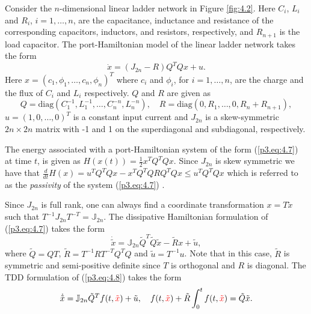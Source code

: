 Consider the $n$-dimensional linear ladder network in Figure \ref{fig:4.2}. Here $C_i$, $L_i$ and $R_i$, $i=1,\dots,n$, are the capacitance, inductance and resistance of the corresponding capacitors, inductors, and resistors, respectively, and $R_{n+1}$ is the load capacitor. The port-Hamiltonian model of the linear ladder network takes the form
\begin{equation} \label{p3.eq:4.7}
		\dot x = (J_{2n} - R)Q^TQx + u.
\end{equation}
Here $x = (c_1,\phi_1,\dots,c_n,\phi_n)^T$ where $c_i$ and $\phi_i$, for $i=1,\dots,n$, are the charge and the flux of $C_i$ and $L_i$ respectively. $Q$ and $R$ are given as
\begin{equation}
	Q = \text{diag}(C_1^{-1},L_1^{-1},\dots,C_n^{-n},L_n^{-n}), \quad R = \text{diag}(0,R_1,\dots,0,R_n+R_{n+1}),
\end{equation}
$u=(1,0,\dots,0)^T$ is a constant input current and $J_{2n}$ is a skew-symmetric $2n\times 2n$ matrix with -1 and 1 on the superdiagonal and subdiagonal, respectively. 

The energy associated with a port-Hamiltonian system of the form (\ref{p3.eq:4.7}) at time $t$, is given as $H(x(t)) = \frac 1 2 x^T Q^T Q x$. Since $J_{2n}$ is skew symmetric we have that $\frac d {dt} H(x) = u^T Q^T Q x - x^T Q^T Q R Q^T Q x \leq u^T Q^T Q x$ which is referred to as the \emph{passivity} of the system (\ref{p3.eq:4.7}) \cite{vanderSchaft:1996es,Willems:1972ek}.

Since $J_{2n}$ is full rank, one can always find a coordinate transformation $ x= T \tilde x$ such that $T^{-1} J_{2n} T^{-T} = \mathbb J_{2n}$. The dissipative Hamiltonian formulation of (\ref{p3.eq:4.7}) takes the form
\begin{equation} \label{p3.eq:4.8}
	\dot {\tilde x} = \mathbb J_{2n} \tilde Q^T\tilde Q \tilde x - \tilde Rx + \tilde u,
\end{equation}
where $\tilde Q = QT$, $\tilde R = T^{-1}RT^{-T}Q^TQ$ and $\tilde u = T^{-1} u$. Note that in this case, $\tilde R$ is symmetric and semi-positive definite since $T$ is orthogonal and $R$ is diagonal. The TDD formulation of (\ref{p3.eq:4.8}) takes the form
\begin{equation} \label{p3.eq:4.9}
	\dot{\tilde x} = \mathbb{J}_{2n} \tilde Q^T f(t,{\color{red} \tilde x}) + \tilde u, \quad f(t,{\color{red} \tilde x}) + \tilde R \int_0^t f(t,{\color{red} \tilde x}) = \tilde Q \tilde x.
\end{equation}




